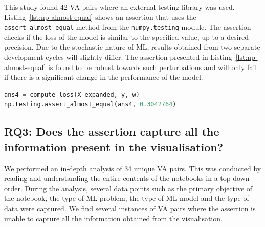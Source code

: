 \documentclass[conference]{IEEEtran}
\begin{document}
This study found 42 VA pairs where an external testing library was used. Listing~\ref{lst:np-almost-equal} shows an assertion that uses the \texttt{assert\_almost\_equal} method from the \texttt{numpy.testing} module. The assertion checks if the loss of the model is similar to the specified value, up to a desired precision. Due to the stochastic nature of ML, results obtained from two separate development cycles will slightly differ. The assertion presented in Listing~\ref{lst:np-almost-equal} is found to be robust towards such perturbations and will only fail if there is a significant change in the performance of the model.

\begin{lstlisting}[language=Python, caption={Assertion to check that the loss of the model is similar to the specified value.}, label={lst:np-almost-equal}]
ans4 = compute_loss(X_expanded, y, w)
np.testing.assert_almost_equal(ans4, 0.3042764) 
\end{lstlisting}

\subsection{RQ3: Does the assertion capture all the information present in the visualisation?}\label{sec:result-rq2-p3}

We performed an in-depth analysis of 34 unique VA pairs. This was conducted by reading and understanding the entire contents of the notebooks in a top-down order. During the analysis, several data points such as the primary objective of the notebook, the type of ML problem, the type of ML model and the type of data were captured. We find several instances of VA pairs where the assertion is unable to capture all the information obtained from the visualisation.
\end{document}
